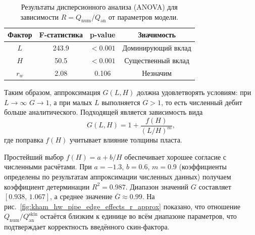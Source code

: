 \documentclass{article}
\begin{document}
\begin{table}[H]
	\centering
	\caption{Результаты дисперсионного анализа (ANOVA) для зависимости $R = Q_{\text{num}}/Q_{\text{an}}$ от параметров модели.}
	\begin{tabular}{|c|c|c|c|} %
		\hline %
		\textbf{Фактор} & \textbf{F-статистика} & \textbf{p-value} & \textbf{Значимость} \\
		\hline %
		$L$             & 243.9                 & $< 0.001$        & Доминирующий вклад  \\
		\hline %
		$H$             & 50.5                  & $< 0.001$        & Существенный вклад  \\
		\hline %
		$r_w$           & 2.08                  & 0.106            & Незначим            \\
		\hline %
	\end{tabular}
	\label{tab:anova_results}
\end{table}

Таким образом, аппроксимация $G(L,H)$ должна удовлетворять условиям:
при $L \to \infty$ $G \to 1$, а при малых $L$ выполняется $G > 1$,
то есть численный дебит больше аналитического. Подходящей является зависимость вида
\begin{equation}
	\displaystyle
	G \left(L, H \right) = 1 + \dfrac{f \left(H\right)}{\left(L/H\right)^m}, %
	\label{eq:kham_G_approx_common}
\end{equation}
где поправка $f(H)$ учитывает влияние толщины пласта.

Простейший выбор $f(H) = a + b/H$ обеспечивает хорошее согласие с численными расчётами.
При $a=-1.3$, $b=0.6$, $m=0.9$ (коэффициенты определены по результатам аппроксимации численных данных)
получаем коэффициент детерминации $R^2 = 0.987$.
Диапазон значений $G$ составляет $[0.938,\,1.067]$, а среднее значение $\overline{G} \approx 0.99$.
На рис.~\ref{fig:kham_hw_pipe_edge_effects_r_approx} показано, что отношение
$Q_{\text{num}}/Q_{\text{an}}^{\text{skin}}$ остаётся близким к единице во всём диапазоне параметров,
что подтверждает корректность введённого скин-фактора.
\end{document}
